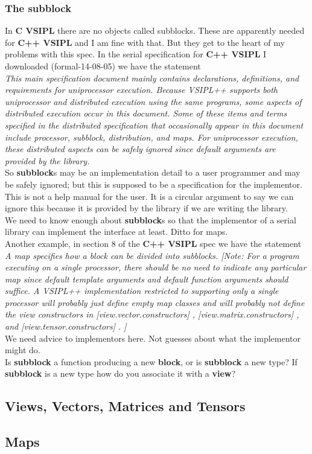 \documentclass[11pt, oneside]{article}
\newcommand{\cvl}{\ttbf{C VSIPL}}
\newcommand{\cvpp}{\ttbf{C++ VSIPL}}
\newcommand{\ttbf}[1]{{\ttfamily \bfseries #1}}
\newcommand{\blk}{\ttbf{block}}
\newcommand{\vw}{\ttbf{view}}
\begin{document}
\subsubsection{The \ttbf{subblock}}
In \cvl{} there are no objects called subblocks. These are apparently needed for \cvpp{} and I am fine with that. But they get to the heart of my problems with this spec. In the serial specification for \cvpp{} I downloaded (formal-14-08-05) we have the statement\\[3pt]
\emph{
This main specification document mainly contains declarations, definitions, and requirements for uniprocessor execution. Because VSIPL++ supports both uniprocessor and distributed execution using the same programs, some aspects of distributed execution occur in this document. Some of these items and terms specified in the distributed specification that occasionally appear in this document include processor, subblock, distribution, and maps. For uniprocessor execution, these distributed aspects can be safely ignored since default arguments are provided by the library.}\\[3pt]
So \ttbf{subblock}s may be an implementation detail to a user programmer and may be safely ignored; but this is supposed to be a specification for the implementor. This is not a help manual for the user. It is a circular argument to say we can ignore this because it is provided by the library if we are writing the library.
\\ We need to know enough about \ttbf{subblock}s so that the implementor of a serial library can implement the interface at least. Ditto for maps.
\\[6pt]
Another example, in section 8 of the \cvpp{} spec we have the statement\\[3pt]
\emph{A map specifies how a block can be divided into subblocks. [Note: For a program executing on a single processor, there should be no need to indicate any particular map since default template arguments and default function arguments should suffice. A VSIPL++ implementation restricted to supporting only a single processor will probably just define empty map classes and will probably not define the view constructors in [view.vector.constructors] , [view.matrix.constructors] , and [view.tensor.constructors] . ]}
\\[3pt]
We need advice to implementors here.  Not guesses about what the implementor might do.
\\[6pt]
Is \ttbf{subblock} a function producing a new \blk{}, or is \ttbf{subblock} a new type?  If \ttbf{subblock} is a new type how do you associate it with a \vw{}? 
\subsection{Views, Vectors, Matrices and Tensors}
\subsection{Maps}
\end{document}
